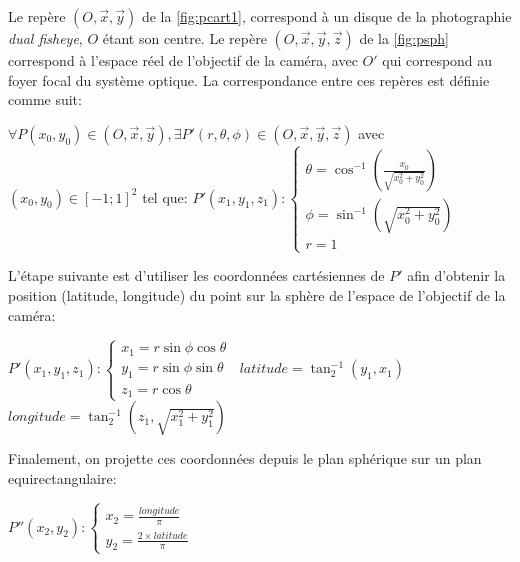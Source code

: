 			\par
			Le repère $(O,\vec{x},\vec{y})$ de la \autoref{fig:pcart1}, correspond à un disque de la photographie \emph{dual fisheye}, $O$ étant son centre.
			Le repère $(O,\vec{x},\vec{y},\vec{z})$ de la \autoref{fig:psph} correspond à l'espace réel de l'objectif de la caméra, avec $O'$ qui correspond au foyer focal du système optique.
			La correspondance entre ces repères est définie comme suit:
			\begin{center}
				$\forall P(x_{0},y_{0}) \in (O,\vec{x},\vec{y}), \exists P'(r,\theta,\phi) \in (O,\vec{x},\vec{y},\vec{z})$ avec $(x_{0},y_{0}) \in [-1;1]^2$ tel que: \newline
				$P'(x_{1},y_{1},z_{1}): \left\{
				\begin{array}{ll}
				\theta = \cos^{-1}{\left(\frac{x_{0}}{\sqrt{x_{0}^2+y_{0}^2}}\right)} \\
				\phi = \sin^{-1}{\left(\sqrt{x_{0}^2+y_{0}^2}\right)} \\
				r = 1
				\end{array}
				\right.\ $
			\end{center}
			L'étape suivante est d'utiliser les coordonnées cartésiennes de $P'$ afin d'obtenir la position (latitude, longitude) du point sur la sphère de l'espace de l'objectif de la caméra:
			\begin{center}
				$P'(x_{1},y_{1},z_{1}): \left\{
				\begin{array}{ll}
				x_{1} = r \sin \phi \cos \theta \\
				y_{1} = r \sin \phi \sin \theta \\
				z_{1} = r \cos \theta
				\end{array}
				\right.\ $ \newline \newline
				$ latitude = \tan^{-1}_{2}\left(y_{1}, x_{1}\right) $ \newline
				$ longitude = \tan^{-1}_{2}\left(z_{1}, \sqrt{x_{1}^2+y_{1}^2}\right) $ \newline
			\end{center}
			Finalement, on projette ces coordonnées depuis le plan sphérique sur un plan equirectangulaire:
			\begin{center}
				$P''(x_{2},y_{2}): \left\{
				\begin{array}{ll}
				x_{2} = \frac{longitude}{\pi} \\
				y_{2} = \frac{2 \times latitude}{\pi}
				\end{array}
				\right.\ $
			\end{center}
			
